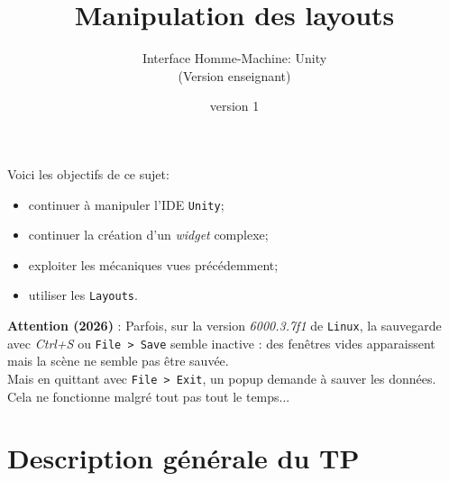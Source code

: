 \documentclass[a4paper,10pt]{article}
\newenvironment{solution}%
{\begin{tcolorbox}[breakable,colback=red!5!white,colframe=red!75!black,title=Solution]}%
{\end{tcolorbox}}
\newenvironment{attention}%
{\begin{tcolorbox}[breakable,colback=green!25!white,colframe=red!55!black,title=Attention]}%
{\end{tcolorbox}}
\begin{document}
	


\title{\vspace*{-1cm}Manipulation des layouts}
\author{\vspace*{-1.5cm}Interface Homme-Machine: Unity
\begin{ensnote}
	(Version enseignant)
\end{ensnote}
}
\date{\vspace*{-1.5cm}version 1}
\maketitle
\thispagestyle{fancy}

Voici les objectifs de ce sujet:
\begin{itemize}
	\item continuer à manipuler l'IDE \texttt{Unity};
	\item continuer la création d'un \textit{widget} complexe;
	\item exploiter les mécaniques vues précédemment;
	\item utiliser les \texttt{Layouts}.
\end{itemize}


%	

\ifversionenseignant
\begin{solution}
\textbf{Attention (2026)} : Parfois, sur la version \textit{6000.3.7f1} de \texttt{Linux}, la sauvegarde avec \textit{Ctrl+S} ou  \texttt{File > Save} semble inactive : des fenêtres vides apparaissent mais la scène ne semble pas être sauvée. \\
Mais en quittant avec \texttt{File > Exit}, un popup demande à sauver les données. Cela ne fonctionne malgré tout pas tout le temps...
\end{solution}
\fi 


\section{Description générale du TP}
\end{document}
